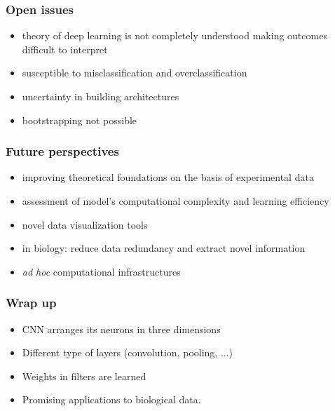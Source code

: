 \begin{frame}
	\frametitle{Open issues}

	\begin{itemize}
		\item theory of deep learning is not completely understood making outcomes difficult to interpret
		\item susceptible to misclassification and overclassification
		\item uncertainty in building architectures
		\item bootstrapping not possible
	\end{itemize}

\end{frame}

\begin{frame}
        \frametitle{Future perspectives}

        \begin{itemize}
		\item improving theoretical foundations on the basis of experimental data
		\item assessment of model's computational complexity and learning efficiency
		\item novel data visualization tools
		\item in biology: reduce data redundancy and extract novel information
		\item \textit{ad hoc} computational infrastructures
	\end{itemize}

\end{frame}

\begin{frame}
        \frametitle{Wrap up}

        \begin{itemize}
                \item CNN arranges its neurons in three dimensions
                \item Different type of layers (convolution, pooling, ...)
                \item Weights in filters are learned
		\item Promising applications to biological data.
        \end{itemize}

\end{frame}




















